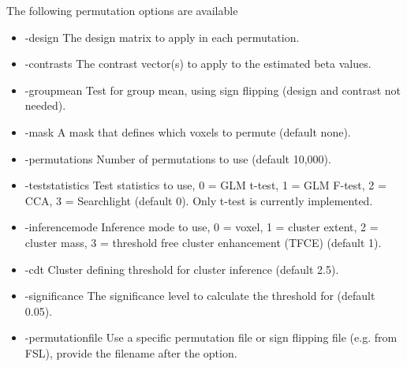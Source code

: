 The following permutation options are available

\begin{itemize}

\item -design
\newline \newline The design matrix to apply in each permutation. 

\item -contrasts                 
\newline \newline The contrast vector(s) to apply to the estimated beta values. 

\item -groupmean                 
\newline \newline Test for group mean, using sign flipping \newline (design and contrast not needed). 

\item -mask                      
\newline \newline A mask that defines which voxels to permute (default none). 

\item -permutations              
\newline \newline Number of permutations to use (default 10,000). 

\item -teststatistics            
\newline \newline Test statistics to use, 0 = GLM t-test, 1 = GLM F-test, 2 = CCA, 3 = Searchlight (default 0). Only t-test is currently implemented. 

\item -inferencemode             
\newline \newline Inference mode to use, 0 = voxel, 1 = cluster extent, 2 = cluster mass, 3 = threshold free cluster enhancement (TFCE) (default 1). 

\item -cdt                       
\newline \newline Cluster defining threshold for cluster inference (default 2.5). 

\item -significance              
\newline \newline The significance level to calculate the threshold for (default 0.05). 

\item -permutationfile 
\newline \newline Use a specific permutation file or sign flipping file (e.g. from FSL), \newline provide the filename after the option.

\end{itemize}

